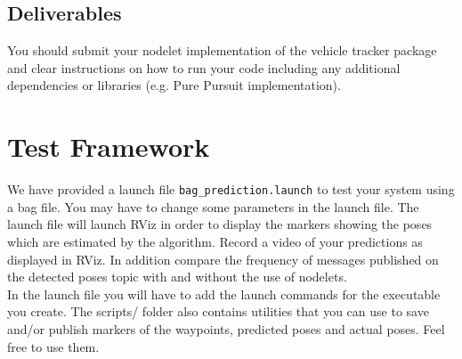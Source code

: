\documentclass[letta4 paper]{article}
\begin{document}
\begin{itemize}
 
\end{itemize}

\subsection{Deliverables}
You should submit your nodelet implementation of the vehicle tracker package and clear instructions on how to run your code including any additional dependencies or libraries (e.g. Pure Pursuit implementation).

\clearpage

\section{Test Framework} 
We have provided a launch file \texttt{bag\_prediction.launch} to test your system using a bag file. You may have to change some parameters in the launch file. 
The launch file will launch RViz in order to display the markers showing the poses which are estimated by the algorithm. Record a video of your predictions as displayed in RViz. In addition compare the frequency of messages published on the detected poses topic with and without the use of nodelets. \\
In the launch file you will have to add the launch commands for the executable you create. The scripts/ folder also contains utilities that you can use to save and/or publish markers of the waypoints, predicted poses and actual poses. Feel free to use them. 
\end{document}

